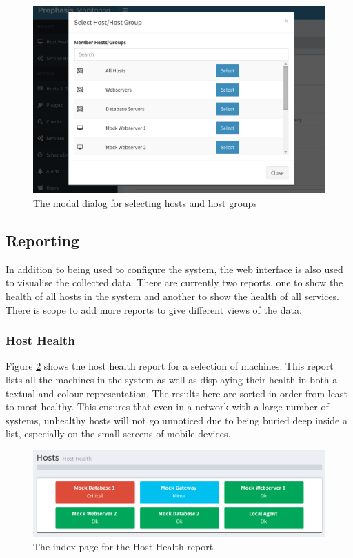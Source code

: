\documentclass[bsc,deptreport,twoside,parskip,singlespacing,notimes]{infthesis}
\begin{document}
\begin{figure}[H]
	\centering
	\caption{The modal dialog for selecting hosts and host groups}
	\label{edit-service-modal}
	\includegraphics[scale=0.44]{assets/screenshots/edit-service-modal.pdf}
\end{figure}

\subsection{Reporting}

	In addition to being used to configure the system, the web interface is also
	used to visualise the collected data.  There are currently two reports, one
	to show the health of all hosts in the system and another to show the health
	of all services.  There is scope to add more reports to give different views
	of the data.
\subsubsection{Host Health}

	Figure \ref{host-health-index} shows the host health report for
	a selection of machines.  This report lists all the machines in the system
	as well as displaying their health in both a textual and colour representation.
	The results here are sorted in order from least to most healthy.  This ensures
	that even in a network with a large number of systems, unhealthy hosts will not
	go unnoticed due to being buried deep inside a list, especially on the small
	screens of mobile devices.

\begin{figure}[H]
	\centering
	\caption{The index page for the Host Health report}
	\label{host-health-index}
	\includegraphics[scale=0.7]{assets/screenshots/host-health-index.pdf}
\end{figure}
\end{document}
